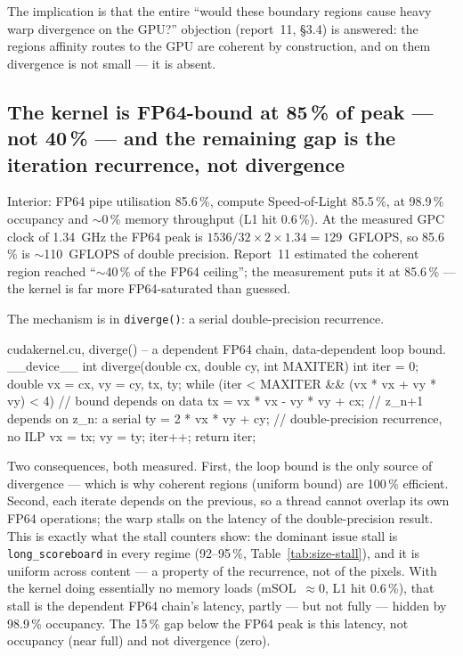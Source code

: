 \documentclass[
	english,
	letterpaper, oneside
]{article}
\begin{document}
The implication is that the entire ``would these boundary regions cause heavy
warp divergence on the GPU?'' objection (report~11, \S3.4) is answered: the
regions affinity routes to the GPU are coherent by construction, and on
them divergence is not small --- it is absent.

\subsection{The kernel is FP64-bound at 85\,\% of peak --- not 40\,\% --- and the
remaining gap is the iteration recurrence, not divergence}\label{sec:fp64}

Interior: FP64 pipe utilisation 85.6\,\%, compute Speed-of-Light 85.5\,\%, at
98.9\,\% occupancy and $\sim$0\,\% memory throughput (L1 hit 0.6\,\%). At the
measured GPC clock of 1.34~GHz the FP64 peak is $1536/32\times2\times1.34=129$~GFLOPS,
so 85.6\,\% is $\sim$110~GFLOPS of double precision. Report~11 estimated
the coherent region reached ``$\sim$40\,\% of the FP64 ceiling''; the measurement
puts it at 85.6\,\% --- the kernel is far more FP64-saturated than
guessed.

The mechanism is in \texttt{diverge()}: a serial double-precision recurrence.

\begin{sourcecode}{cuda}{kernel.cu, diverge() -- a dependent FP64 chain, data-dependent loop bound.}
__device__ int diverge(double cx, double cy, int MAXITER) {
  int iter = 0;
  double vx = cx, vy = cy, tx, ty;
  while (iter < MAXITER && (vx * vx + vy * vy) < 4) {  // bound depends on data
    tx = vx * vx - vy * vy + cx;   // z_{n+1} depends on z_n: a serial
    ty = 2 * vx * vy + cy;         // double-precision recurrence, no ILP
    vx = tx;
    vy = ty;
    iter++;
  }
  return iter;
}
\end{sourcecode}

Two consequences, both measured. First, the loop bound is the only source of
divergence --- which is why coherent regions (uniform bound) are 100\,\%
efficient. Second, each iterate depends on the previous, so a thread cannot
overlap its own FP64 operations; the warp stalls on the latency of the
double-precision result. This is exactly what the stall counters show: the
dominant issue stall is \texttt{long\_scoreboard} in every regime
(92--95\,\%, Table~\ref{tab:size-stall}), and it is uniform across content
--- a property of the recurrence, not of the pixels. With the kernel doing
essentially no memory loads (mSOL~$\approx0$, L1 hit 0.6\,\%), that stall is the
dependent FP64 chain's latency, partly --- but not fully --- hidden by 98.9\,\%
occupancy. The 15\,\% gap below the FP64 peak is this latency, not occupancy
(near full) and not divergence (zero).
\end{document}
